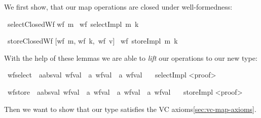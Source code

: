 \documentclass[11pt]{article}
\begin{document}
We first show, that our map operations are closed under well-formedness:

\begin{isabellebody}
\isamarkupfalse%
\ selectClosedWf{\isacharcolon}{\kern0pt}
{\isachardoublequoteopen}wf\ m {\isasymRightarrow}\ wf\ {\isacharparenleft}{\kern0pt}selectImpl\ m\ k{\isacharparenright}{\kern0pt}{\isachardoublequoteclose}\isanewline

\isamarkupfalse%
\ storeClosedWf{\isacharcolon}{\kern0pt}
{\isachardoublequoteopen}[wf\ m, wf\ k,\ wf\ v] {\isasymRightarrow}\ wf\ {\isacharparenleft}{\kern0pt}storeImpl\ m\ k{\isacharparenright}{\kern0pt}{\isachardoublequoteclose}\isanewline
\end{isabellebody}

With the help of these lemmas we are able to \emph{lift} our operations to our new type:
\begin{isabellebody}
\isamarkupfalse%
\ wf{\isacharunderscore}{\kern0pt}select\ {\isacharcolon}{\kern0pt}{\isacharcolon}{\kern0pt}\ {\isachardoublequoteopen}{\isacharprime}{\kern0pt}a{\isacharcolon}{\kern0pt}{\isacharcolon}{\kern0pt}absval\ wf{\isacharunderscore}{\kern0pt}val\ {\isasymRightarrow}\ {\isacharprime}{\kern0pt}a\ wf{\isacharunderscore}{\kern0pt}val\ {\isasymRightarrow}\ {\isacharprime}{\kern0pt}a\ wf{\isacharunderscore}{\kern0pt}val{\isachardoublequoteclose}\isanewline
\ \ \ selectImpl\isanewline
<proof>\isanewline

\isamarkupfalse%
\ wf{\isacharunderscore}{\kern0pt}store\ {\isacharcolon}{\kern0pt}{\isacharcolon}{\kern0pt}\ {\isachardoublequoteopen}{\isacharprime}{\kern0pt}a{\isacharcolon}{\kern0pt}{\isacharcolon}{\kern0pt}absval\ wf{\isacharunderscore}{\kern0pt}val\ {\isasymRightarrow}\ {\isacharprime}{\kern0pt}a\ wf{\isacharunderscore}{\kern0pt}val\ {\isasymRightarrow}\ {\isacharprime}{\kern0pt}a\ wf{\isacharunderscore}{\kern0pt}val\ {\isasymRightarrow}\ {\isacharprime}{\kern0pt}a\ wf{\isacharunderscore}{\kern0pt}val{\isachardoublequoteclose}\isanewline
\ \ \ storeImpl\isanewline
<proof>\isanewline
\end{isabellebody}


Then we want to show that our type satisfies the VC axioms\ref{sec:vc-map-axioms}.
\end{document}
